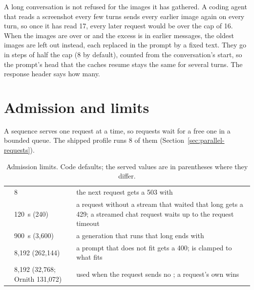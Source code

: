 A long conversation is not refused for the images it has gathered. A coding agent that reads a screenshot every few turns sends every earlier image again on every turn, so once it has read 17, every later request would be over the cap of 16. When the images are over  or  and the excess is in earlier messages, the oldest images are left out instead, each replaced in the prompt by a fixed text. They go in steps of half the cap (8 by default), counted from the conversation's start, so the prompt's head that the caches resume stays the same for several turns. The response header  says how many.

\section{Admission and limits}

A sequence serves one request at a time, so requests wait for a free one in a bounded queue. The shipped profile runs 8 of them (Section~\ref{sec:parallel-requests}).

\begin{table}[htbp]
\centering\small
\caption{Admission limits. Code defaults; the served values are in parentheses where they differ.}\label{tab:admission}
\begin{tabularx}{\linewidth}{@{}L{.24\linewidth}L{.16\linewidth}Y@{}}
\toprule
{} &  &  \\
\midrule
{} & 8 & the next request gets a 503 with  \\
 & 120~s (240) & a request without a stream that waited that long gets a 429; a streamed chat request waits up to the request timeout \\
 & 900~s (3,600) & a generation that runs that long ends with  \\
 & 8,192 (262,144) & a prompt that does not fit gets a 400;  is clamped to what fits \\
 & 8,192 (32,768; Ornith 131,072) & used when the request sends no ; a request's own  wins \\
\bottomrule
\end{tabularx}
\end{table}

